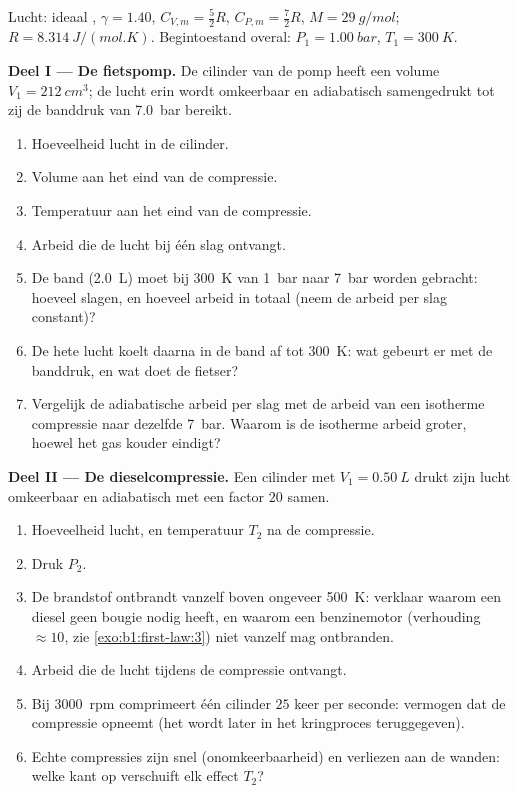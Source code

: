 \begin{problem}
\label{pb:b1:first-law:1}
Lucht: ideaal , $\gamma = 1.40$, $C_{V,m} = \tfrac52 R$, $C_{P,m} =
\tfrac72 R$, $M = \qty{29}{g/mol}$; $R = \qty{8.314}{J/(mol.K)}$. Begintoestand
overal: $P_1 = \qty{1.00}{bar}$, $T_1 = \qty{300}{K}$.

\medskip
\noindent\textbf{Deel I --- De fietspomp.}
De cilinder van de pomp heeft een volume $V_1 = \qty{212}{cm^3}$; de lucht erin
wordt omkeerbaar en adiabatisch samengedrukt tot zij de banddruk
van \qty{7.0}{bar} bereikt.
\begin{enumerate}
  \item Hoeveelheid lucht in de cilinder.
  \item Volume aan het eind van de compressie.
  \item Temperatuur aan het eind van de compressie.
  \item Arbeid die de lucht bij één slag ontvangt.
  \item De band (\qty{2.0}{L}) moet bij \qty{300}{K} van \qty{1}{bar} naar
        \qty{7}{bar} worden gebracht: hoeveel slagen, en hoeveel arbeid
        in totaal (neem de arbeid per slag constant)?
  \item De hete lucht koelt daarna in de band af tot \qty{300}{K}: wat gebeurt er
        met de banddruk, en wat doet de fietser?
  \item Vergelijk de adiabatische arbeid per slag met de arbeid van een
        isotherme compressie naar dezelfde \qty{7}{bar}. Waarom is de
        isotherme arbeid groter, hoewel het gas kouder eindigt?
\end{enumerate}

\medskip
\noindent\textbf{Deel II --- De dieselcompressie.}
Een cilinder met $V_1 = \qty{0.50}{L}$ drukt zijn lucht omkeerbaar en
adiabatisch met een factor $20$ samen.
\begin{enumerate}[resume]
  \item Hoeveelheid lucht, en temperatuur $T_2$ na de compressie.
  \item Druk $P_2$.
  \item De brandstof ontbrandt vanzelf boven ongeveer \qty{500}{K}: verklaar waarom een
        diesel geen bougie nodig heeft, en waarom een benzinemotor (verhouding
        $\approx 10$, zie \cref{exo:b1:first-law:3}) niet vanzelf mag ontbranden.
  \item Arbeid die de lucht tijdens de compressie ontvangt.
  \item Bij \qty{3000}{rpm} comprimeert één cilinder $25$ keer per seconde:
        vermogen dat de compressie opneemt (het wordt later in het
        kringproces teruggegeven).
  \item Echte compressies zijn snel (onomkeerbaarheid) en verliezen  aan de
        wanden: welke kant op verschuift elk effect $T_2$?
\end{enumerate}


\end{problem}
